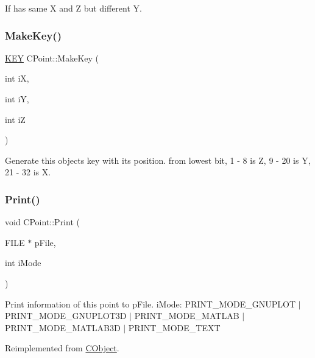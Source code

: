 If has same X and Z but different Y. 

\mbox{\label{classCPoint_aa93327a1be5e5d9df55f3eb9750af25d}} 
\subsubsection{\texorpdfstring{MakeKey()}{MakeKey()}}
{\footnotesize\ttfamily \mbox{\hyperlink{res2dmp_8cpp_a8ae9d53f33f46cfcfcb9736e6351452a}{K\+EY}} C\+Point\+::\+Make\+Key (\begin{DoxyParamCaption}\item[{int}]{iX,  }\item[{int}]{iY,  }\item[{int}]{iZ }\end{DoxyParamCaption})\hspace{0.3cm}{\ttfamily [static]}}

Generate this object\textquotesingle{}s key with its position. from lowest bit, 1 -\/ 8 is Z, 9 -\/ 20 is Y, 21 -\/ 32 is X. \mbox{\label{classCPoint_a1610463f19b7ff508ed229791dd6335d}} 
\subsubsection{\texorpdfstring{Print()}{Print()}}
{\footnotesize\ttfamily void C\+Point\+::\+Print (\begin{DoxyParamCaption}\item[{F\+I\+LE $\ast$}]{p\+File,  }\item[{int}]{i\+Mode }\end{DoxyParamCaption})\hspace{0.3cm}{\ttfamily [virtual]}}

Print information of this point to p\+File. i\+Mode\+: P\+R\+I\+N\+T\+\_\+\+M\+O\+D\+E\+\_\+\+G\+N\+U\+P\+L\+OT $\vert$ P\+R\+I\+N\+T\+\_\+\+M\+O\+D\+E\+\_\+\+G\+N\+U\+P\+L\+O\+T3D $\vert$ P\+R\+I\+N\+T\+\_\+\+M\+O\+D\+E\+\_\+\+M\+A\+T\+L\+AB $\vert$ P\+R\+I\+N\+T\+\_\+\+M\+O\+D\+E\+\_\+\+M\+A\+T\+L\+A\+B3D $\vert$ P\+R\+I\+N\+T\+\_\+\+M\+O\+D\+E\+\_\+\+T\+E\+XT 

Reimplemented from \mbox{\hyperlink{classCObject_a75afd905b2d14ed374c75d90f079a389}{C\+Object}}.

\mbox{\label{classCPoint_ac9557dddaefffd4c7cc0a20090ef5324}} 
